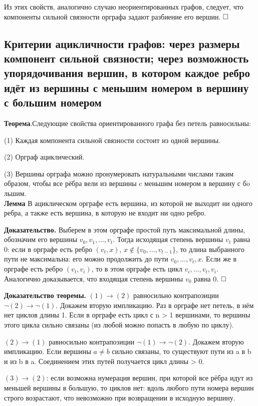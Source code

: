 \documentclass[a4paper, 10pt]{article}
\begin{document}
Из этих свойств, аналогично случаю неориентированных графов, следует, что компоненты сильной связности орграфа задают разбиение его вершин. $\hfill \square$



\subsection{Критерии ацикличности графов: через размеры компонент сильной связности; через возможность упорядочивания вершин, в котором каждое ребро идёт из вершины с меньшим номером в вершину с большим номером}

\textbf{Теорема}.Следующие свойства ориентированного графа без петель равносильны:

(1) Каждая компонента сильной связности состоит из одной вершины.

(2) Орграф ациклический.

(3) Вершины орграфа можно пронумеровать натуральными числами таким образом, чтобы все рёбра вели из вершины c меньшим номером в вершину с б$\acute{o}$льшим. \\

\textbf{Лемма} В ациклическом орграфе есть вершина, из которой не выходит ни одного ребра, а также есть вершина, в которую не входит ни одно ребро.

\textbf{Доказательство.} Выберем в этом орграфе простой путь максимальной длины, обозначим его вершины $v_0, v_1, ... , v_t$. Тогда исходящая степень вершины $v_t$ равна 0: если в орграфе есть ребро $(v_t, x)$, $x \notin \{v_0, ..., v_{t-1}\}$, то длина выбранного пути не максимальна: его можно продолжить до пути $v_0, ... , v_t, x$. Если же в орграфе есть ребро $(v_t, v_i)$, то в этом орграфе есть цикл $v_i, ... , v_t, v_i$.
Аналогично доказывается, что входящая степень вершины $v_0$ равна 0. $\hfill \square$

\medskip

\textbf{Доказательство теоремы.} $(1) \to (2)$ равносильно контрапозиции $\neg(2) \to \neg(1)$. Докажем вторую импликацию. Раз в орграфе нет петель, в нём нет циклов длины 1. Если в орграфе есть цикл с n > 1 вершинами, то вершины этого цикла сильно связаны (из любой можно попасть в любую по циклу).

$(2) \to (1)$ равносильно контрапозиции $\neg (1) \to \neg(2)$. Докажем вторую импликацию. Если вершины $a \neq b$ сильно связаны, то существуют пути из a в b и из b в a. Соединением этих путей получается цикл длины > 0.

$(3) \to (2)$: если возможна нумерация вершин, при которой все рёбра идут из меньшей вершины в большую, то циклов нет: вдоль любого пути номера вершин строго возрастают, что невозможно при возвращении в исходную вершину.
\end{document}
